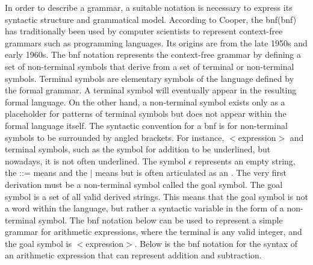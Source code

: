 In order to describe a grammar, a suitable notation is necessary to express its syntactic structure and grammatical model. According to Cooper, the \acrlong{bnf}(\acrshort{bnf}) has traditionally been used by computer scientists to represent context-free grammars such as programming languages. Its origins are from the late 1950s and early 1960s. The \acrshort{bnf} notation represents the context-free grammar by defining a set of non-terminal symbols that derive from a set of terminal or non-terminal symbols. Terminal symbols are elementary symbols of the language defined by the formal grammar. A terminal symbol will eventually appear in the resulting formal language. On the other hand, a non-terminal symbol exists only as a placeholder for patterns of terminal symbols but does not appear within the formal language itself. The syntactic convention for a \acrshort{bnf} is for non-terminal symbols to be surrounded by angled brackets. For instance, $<$expression$>$ and terminal symbols, such as the symbol for addition \say{+} to be underlined, but nowadays, it is not often underlined. The symbol $\epsilon$ represents an empty string, the ::= means  and the $\mid$ means  but is often articulated as an  \cite{cooper2011engineering}. The very first derivation must be a non-terminal symbol called the goal symbol. The goal symbol is a set of all valid derived strings. This means that the goal symbol is not a word within the language, but rather a syntactic variable in the form of a non-terminal symbol. The \acrshort{bnf} notation below can be used to represent a simple grammar for arithmetic expressions, where the terminal  is any valid integer, and the goal symbol is $<$expression$>$. Below is the \acrshort{bnf} notation for the syntax of an arithmetic expression that can represent addition and subtraction.

\noindent
\begin{algorithm}
\begin{bnf*}
		{}\\
		\\
		\\
\end{bnf*}
\end{algorithm}
\FloatBarrier

